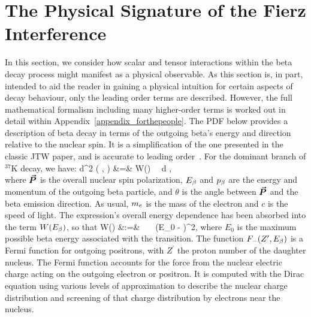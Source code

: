 \section{The Physical Signature of the Fierz Interference}
\label{sec:mathdescription_intro}
In this section, we consider how scalar and tensor interactions within the beta decay process might manifest as a physical observable.  As this section is, in part, intended to aid the reader in gaining a physical intuition for certain aspects of decay behaviour, only the leading order terms are described. However, the full mathematical formalism including many higher-order terms is worked out in detail within Appendix~\ref{appendix_forthepeople}.
The \ac{PDF} below provides a description of beta decay in terms of the outgoing beta's energy and direction relative to the nuclear spin.  It is a simplification of the one presented in the classic \ac{JTW} paper, and is accurate to leading order~\cite{jtw}\cite{jtw_coulomb}\cite{EbelFeldman1957}.  For the dominant branch of $^{37}$K decay, we have:
\bea
	\textrm{d}^2 \Gamma  ( \Ebeta, \theta ) 
	&=&
	W(\Ebeta)  \, \dEe \, \textrm{d} \theta , 
\nonumber \\
\label{equation:integrated_jtw_INTRODUCTION}
\eea
where $\bm{\vec{P}}$ is the overall nuclear spin polarization, $E_{\beta}$ and $p_{\beta}$ are the energy and momentum of the outgoing beta particle, and $\theta$ is the angle between $\bm{\vec{P}}$ and the beta emission direction.  
As usual, $m_e$ is the mass of the electron and $c$ is the speed of light.
The expression's overall energy dependence has been absorbed into the term $W(E_{\beta})$, so that
\bea
W(\Ebeta) &:=&  \, \FFminus \, \xi \, \pe \Ee (E_0 - \Ee)^2,
\label{eq:overallenergydependence_intro}
\eea
where $E_0$ is the maximum possible beta energy associated with the transition.  The function $F_{-}(Z^\prime, E_\beta)$ is a Fermi function for outgoing positrons,
with $Z^\prime$ the proton number of the daughter nucleus.  The Fermi function accounts for the force from the nuclear electric charge acting on the outgoing electron or positron.  It is computed with the Dirac equation using various levels of approximation to describe the nuclear charge distribution and screening of that charge distribution by electrons near the nucleus.

